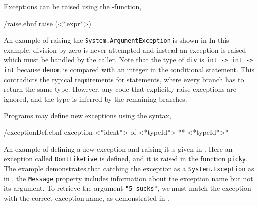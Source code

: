 \documentclass[fsharpNotes.tex]{subfiles}
\begin{document}
Exceptions can be raised using the -function,
%
\begin{verbatimwrite}{\ebnf/raise.ebnf}
raise (<*expr*>)
\end{verbatimwrite}
%
An example of raising the \lstinline{System.ArgumentException} is shown in 
% 
%
In this example, division by zero is never attempted and instead an exception is raised which must be handled by the caller. Note that the type of \lstinline!div! is \lstinline!int -> int -> int! because \lstinline{denom} is compared with an integer in the conditional statement. This contradicts the typical requirements for  statements, where every branch has to return the same type. However, any code that explicitly raise exceptions are ignored, and the type is inferred by the remaining branches.

Programs may define new exceptions using the syntax,
%
\begin{verbatimwrite}{\ebnf/exceptionDef.ebnf}
exception <*ident*> of <*typeId*> {** <*typeId*>*} 
\end{verbatimwrite}
%
An example of defining a new exception and raising it is given in .
%
%
Here an exception called \lstinline!DontLikeFive! is defined, and it is raised in the function \lstinline!picky!. The example demonstrates that catching the exception as a \lstinline{System.Exception} as in , the \lstinline{Message} property includes information about the exception name but not its argument. To retrieve the argument \lstinline{"5 sucks"}, we must match the exception with the correct exception name, as demonstrated in . 
%
%
\end{document}
